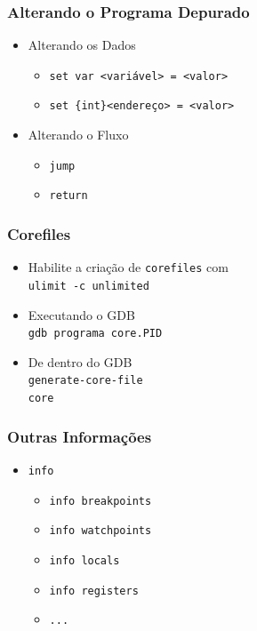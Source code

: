 \documentclass[xcolor=pdftex,dvipsnames,table,t]{beamer}
\begin{document}
\begin{frame}[fragile]
	\frametitle{Alterando o Programa Depurado}
	  \begin{itemize}
	    \item{Alterando os Dados}
	      \begin{itemize}
		\item{\verb|set var <variável> = <valor>|}
		\item{\verb|set {int}<endereço> = <valor>|}
	      \end{itemize}
	    \item{Alterando o Fluxo}
	      \begin{itemize}
		\item{\verb|jump|}
		\item{\verb|return|}
	      \end{itemize}
	  \end{itemize}
\end{frame}

\begin{frame}[fragile]
	\frametitle{Corefiles} %
	  \begin{itemize}
	  \item{Habilite a criação de \verb|corefiles| com \\
		\verb|ulimit -c unlimited|}
	  \item{Executando o GDB \\
		\verb|gdb programa core.PID|}
	  \item{De dentro do GDB \\
		\verb|generate-core-file| \\
		\verb|core|}
	  \end{itemize}
\end{frame}

\begin{frame}[fragile]
	\frametitle{Outras Informações}
	  \begin{itemize}
	    \item{\verb|info|}
	    \begin{itemize}
	      \item{\verb|info breakpoints|}
	      \item{\verb|info watchpoints|}
	      \item{\verb|info locals|}
	      \item{\verb|info registers|}
	      \item{\verb|...|}
	    \end{itemize}
	  \end{itemize}
\end{frame}
\end{document}
